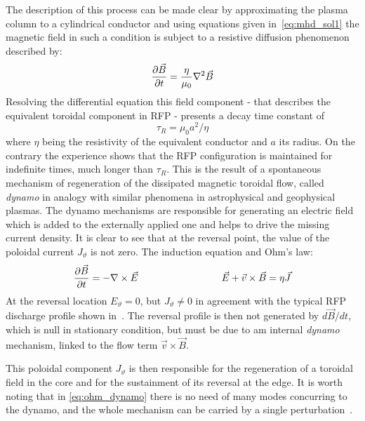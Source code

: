 The description of this process can be made clear by approximating the plasma column to a cylindrical conductor and using equations given in~\eqref{eq:mhd_sol1} the magnetic field in such a condition is subject to a resistive diffusion phenomenon described by:
\begin{equation}
    \pdv{\Vec{B}}{t} = \frac{\eta}{\mu_0} \nabla^2 \Vec{B}
\end{equation}
Resolving the differential equation this field component - that describes the equivalent toroidal component in RFP - presents a decay time constant of $$\tau_R = \mu_0 a^2 / \eta$$ 
where $\eta$ being the resistivity of the equivalent conductor and $a$ its radius.
On the contrary the experience shows that the RFP configuration is maintained for indefinite times, much longer than $\tau_R$. This is the result of a spontaneous mechanism of regeneration of the dissipated magnetic toroidal flow, called \textit{dynamo} in analogy with similar phenomena in astrophysical and geophysical plasmas. The dynamo mechanisms are responsible for generating an electric field which is added to the externally applied one and helps to drive the missing current density. 
It is clear to see that at the reversal point, the value of the poloidal current $J_\vartheta$ is not zero. The induction equation and Ohm’s law:
\begin{equation*}
    \pdv{\Vec{B}}{t} = - \nabla \times \Vec{E}  \hspace{3cm} \Vec{E} + \Vec{v} \times \Vec{B} = \eta \Vec{J}
    \label{eq:ohm_dynamo}
\end{equation*}
At the reversal location $E_\vartheta = 0$, 
but $J_\vartheta \neq 0$ in agreement with the typical RFP discharge profile shown  in~\Figure{\ref{fig:intro_safety_factor_profiles}}.
The reversal profile is then not generated by $d\Vec{B}/dt$, which is null in stationary condition, but must be due to am internal \textit{dynamo} mechanism, linked to the flow term $\Vec{v} \times \Vec{B}$.

This poloidal component $J_\vartheta$ is then responsible for the regeneration of a toroidal field in the core and for the sustainment of its reversal at the edge. It is worth noting that in \eqref{eq:ohm_dynamo} there is no need of many modes concurring to the dynamo, and the whole mechanism can be carried by a single perturbation~\cite{Bonomo39}.

